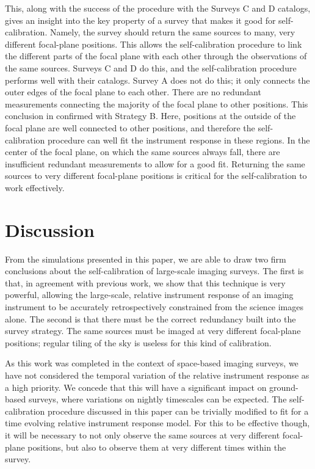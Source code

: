 \documentclass[preprint,pdftex]{aastex}
\begin{document}
This, along with the success of the procedure with the Surveys C and D catalogs, gives an insight into the key property of a survey that makes it good for self-calibration. Namely, the survey should return the same sources to many, very different focal-plane positions. This allows the self-calibration procedure to link the different parts of the focal plane with each other through the observations of the same sources. Surveys C and D do this, and the self-calibration procedure performs well with their catalogs. Survey A does not do this; it only connects the outer edges of the focal plane to each other. There are no redundant measurements connecting the majority of the focal plane to other positions. This conclusion in confirmed with Strategy B. Here, positions at the outside of the focal plane are well connected to other positions, and therefore the self-calibration procedure can well fit the instrument response in these regions. In the center of the focal plane, on which the same sources always fall, there are insufficient redundant measurements to allow for a good fit. Returning the same sources to very different focal-plane positions is critical for the self-calibration to work effectively. 

\section{Discussion}
From the simulations presented in this paper, we are able to draw two firm conclusions about the self-calibration of large-scale imaging surveys. The first is that, in agreement with previous work, we show that this technique is very powerful, allowing the large-scale, relative instrument response of an imaging instrument to be accurately retrospectively constrained from the science images alone. The second is that there must be the correct redundancy built into the survey strategy. The same sources must be imaged at very different focal-plane positions; regular tiling of the sky is useless for this kind of calibration. 

As this work was completed in the context of space-based imaging surveys, we have not considered the temporal variation of the relative instrument response as a high priority. We concede that this will have a significant impact on ground-based surveys, where variations on nightly timescales can be expected. The self-calibration procedure discussed in this paper can be trivially modified to fit for a time evolving relative instrument response model. For this to be effective though, it will be necessary to not only observe the same sources at very different focal-plane positions, but also to observe them at very different times within the survey.  
\end{document}
